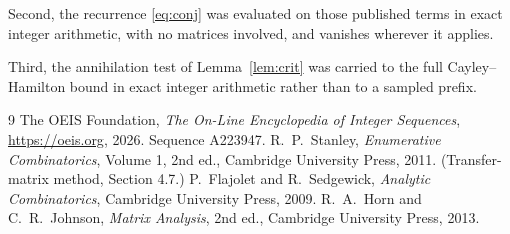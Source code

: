 \documentclass[11pt,a4paper]{article}
\theoremstyle{plain}
\theoremstyle{definition}
\begin{document}
Second, the recurrence \eqref{eq:conj} was evaluated on those published terms in exact
integer arithmetic, with no matrices involved, and vanishes wherever it applies.

Third, the annihilation test of Lemma~\ref{lem:crit} was carried to the full
Cayley--Hamilton bound in exact integer arithmetic rather than to a sampled prefix.

\begin{thebibliography}{9}
 The OEIS Foundation, \emph{The On-Line Encyclopedia of Integer
Sequences}, \url{https://oeis.org}, 2026. Sequence A223947.
 R.~P.~Stanley, \emph{Enumerative Combinatorics}, Volume 1, 2nd ed.,
Cambridge University Press, 2011. (Transfer-matrix method, Section 4.7.)
 P.~Flajolet and R.~Sedgewick, \emph{Analytic Combinatorics}, Cambridge
University Press, 2009.
 R.~A.~Horn and C.~R.~Johnson, \emph{Matrix Analysis}, 2nd ed., Cambridge
University Press, 2013.
\end{thebibliography}
\end{document}
